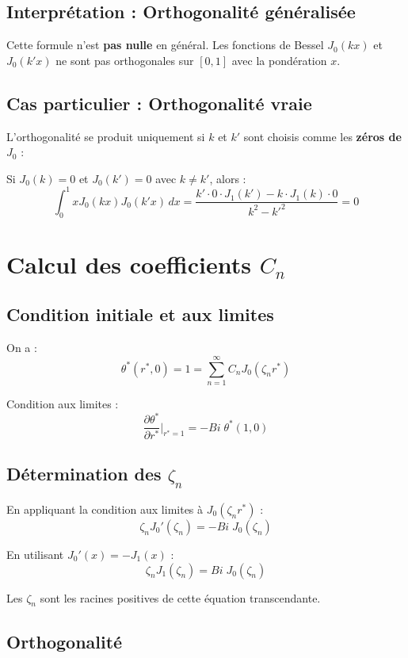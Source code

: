 \documentclass[a4paper,11pt]{article}
\begin{document}
\subsection*{Interprétation : Orthogonalité généralisée}

Cette formule n'est \textbf{pas nulle} en général. Les fonctions de Bessel $J_0(kx)$ et $J_0(k'x)$ ne sont pas orthogonales sur $[0,1]$ avec la pondération $x$.

\subsection*{Cas particulier : Orthogonalité vraie}

L'orthogonalité se produit uniquement si $k$ et $k'$ sont choisis comme les \textbf{zéros de $J_0$} :

Si $J_0(k) = 0$ et $J_0(k') = 0$ avec $k \neq k'$, alors :
\[
\int_0^1 x J_0(kx) J_0(k'x) \, dx = \frac{k' \cdot 0 \cdot J_1(k') - k \cdot J_1(k) \cdot 0}{k^2 - k'^2} = 0
\]

\section*{Calcul des coefficients $C_n$}

\subsection*{Condition initiale et aux limites}

On a :
\[
\theta^*(r^*, 0) = 1 = \sum_{n=1}^{\infty} C_n J_0(\zeta_n r^*)
\]

Condition aux limites :
\[
\frac{\partial \theta^*}{\partial r^*}\bigg|_{r^*=1} = -Bi \; \theta^*(1, 0)
\]

\subsection*{Détermination des $\zeta_n$}

En appliquant la condition aux limites à $J_0(\zeta_n r^*)$ :
\[
\zeta_n J_0'(\zeta_n) = -Bi \; J_0(\zeta_n)
\]

En utilisant $J_0'(x) = -J_1(x)$ :
\[
\boxed{\zeta_n J_1(\zeta_n) = Bi \; J_0(\zeta_n)}
\]

Les $\zeta_n$ sont les racines positives de cette équation transcendante.

\subsection*{Orthogonalité}
\end{document}
